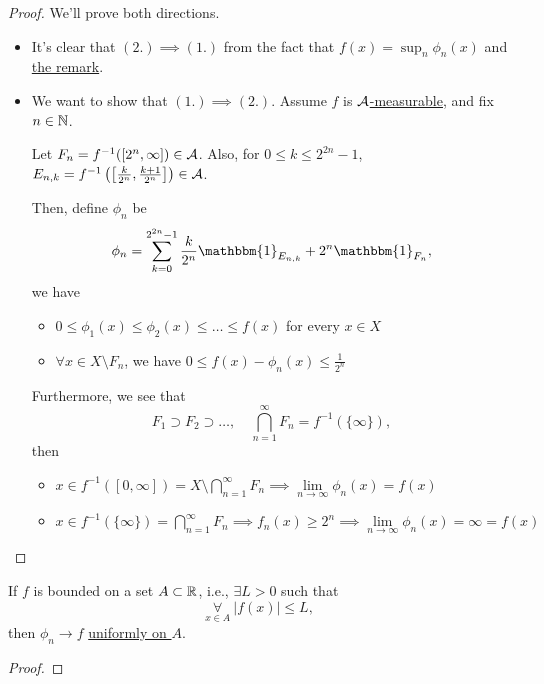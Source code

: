 \begin{proof}
	We'll prove both directions.
	\begin{itemize}
		\item It's clear that \((2.)\implies (1.)\) from the fact that \(f(x) = \sup_n \phi _{n}(x)\) and \hyperref[rmk:Operations-preserve-measurability]{the remark}.
		\item We want to show that \((1.)\implies (2.)\). Assume \(f\) is \hyperref[def:A-measurable-function]{\(\mathcal{\MakeUppercase{a}} \)-measurable}, and fix \(n\in\mathbb{\MakeUppercase{n}} \).

		      \par Let \(F_{n} =f^{-1} ([2^n, \infty ])\in \mathcal{\MakeUppercase{a}}\). Also, for \(0\leq k\leq 2^{2n}-1\), \(E_{n, k} = f^{-1} \left(\left[\frac{k}{2^n}, \frac{k+1}{2^n}\right]\right)\in \mathcal{\MakeUppercase{a}} \).

		      \par Then, define \(\phi _{n}\) be
		      \[
			      \phi _{n} = \sum\limits_{k=0}^{2^{2n} - 1}\frac{k}{2^n}\mathbbm{1}_{E_{n, k}}  + 2^n \mathbbm{1}_{F_n},
		      \]
		      we have
		      \begin{itemize}
			      \item \(0\leq \phi _1(x)\leq \phi _2(x)\leq \ldots \leq f(x) \) for every \(x\in X\)
			      \item \(\forall x\in X\setminus F_{n}\), we have \(0\leq f(x) - \phi _{n}(x)\leq \frac{1}{2^n}\)
		      \end{itemize}

		      \par Furthermore, we see that
		      \[
			      F_1\supset F_2\supset \ldots ,\quad \bigcap\limits_{n=1}^{\infty} F_{n} = f^{-1} (\{\infty \}),
		      \]
		      then
		      \begin{itemize}
			      \item \(x\in f^{-1} ([0, \infty ]) = X\setminus \bigcap\limits_{n=1}^{\infty} F_{n} \implies \lim\limits_{n \to \infty} \phi _{n}(x) = f(x)\)
			      \item \(x\in f^{-1} (\{\infty \}) = \bigcap\limits_{n=1}^{\infty} F_{n}\implies f_{n}(x)\geq 2^n \implies \lim\limits_{n \to \infty} \phi _{n}(x) = \infty = f(x)\)
		      \end{itemize}
	\end{itemize}
\end{proof}

\begin{corollary}
	If \(f\) is bounded on a set \(A\subset \mathbb{\MakeUppercase{r}} \), i.e., \(\exists L > 0 \) such that
	\[
		\underset{x\in A}{\forall }\ \left\vert f(x) \right\vert \leq L,
	\]
	then \(\phi _{n}\to f \) \underline{uniformly on \(A\)}.
\end{corollary}
\begin{proof}
\end{proof}

